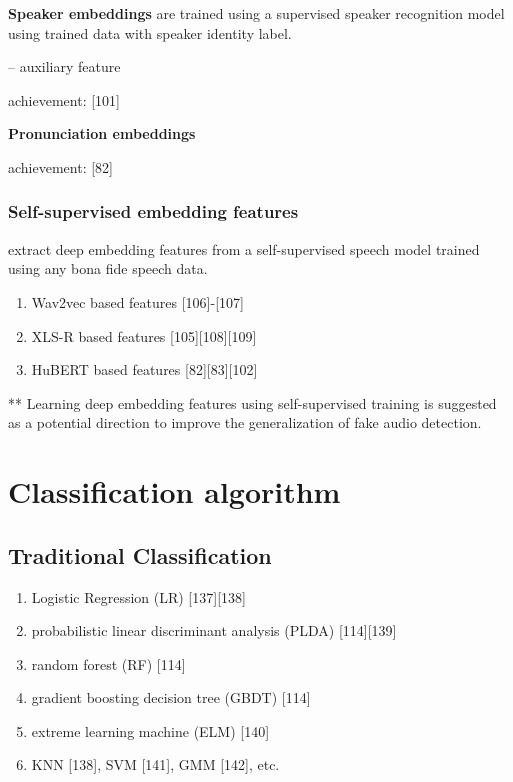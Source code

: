 \documentclass{article}
\begin{document}
\vspace{5pt}
\textbf{Speaker embeddings} are trained using a supervised speaker recognition model using trained data with speaker identity label. 

-- auxiliary feature

achievement: [101]

\vspace{5pt}
\textbf{Pronunciation embeddings}

achievement: [82]

\subsubsection{Self-supervised embedding features}
extract deep embedding features from a self-supervised speech model trained using any bona fide speech data. 

\begin{enumerate}
    \item Wav2vec based features [106]-[107]
    \item XLS-R based features [105][108][109]
    \item HuBERT based features [82][83][102]
\end{enumerate}

** Learning deep embedding features using self-supervised training is suggested as a potential direction to improve the generalization of fake audio detection. 

\section{Classification algorithm}
\subsection{Traditional Classification}

\begin{enumerate}
    \item Logistic Regression (LR) [137][138]
    \item probabilistic linear discriminant analysis (PLDA) [114][139]
    \item random forest (RF) [114]
    \item gradient boosting decision tree (GBDT) [114]
    \item extreme learning machine (ELM) [140]
    \item KNN [138], SVM [141], GMM [142], etc. 
\end{enumerate}
\end{document}
